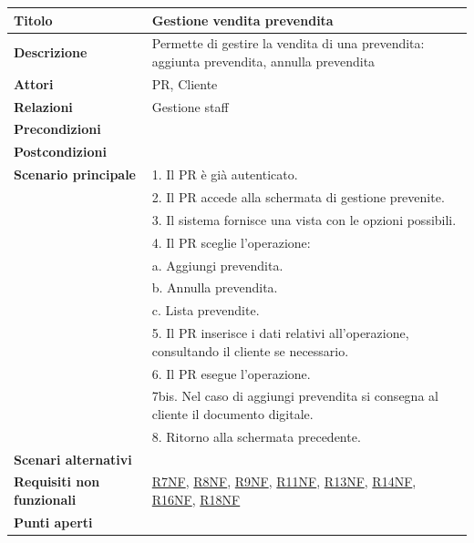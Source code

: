 \documentclass[a4paper]{article}
\begin{document}
\begin{center}
\begin{tabularx}{1\textwidth}{|l|X|}
    \hline
	\textbf{Titolo} & Gestione vendita prevendita \\
	\hline
	\textbf{Descrizione} & Permette di gestire la vendita di una prevendita: aggiunta prevendita, annulla prevendita \\
	\hline
	\textbf{Attori} & PR, Cliente \\
	\hline
	\textbf{Relazioni} & Gestione staff \\
	\hline
	\textbf{Precondizioni} &  \\
	\hline
	\textbf{Postcondizioni} &  \\
	\hline
	\textbf{Scenario principale} & 1. Il PR è già autenticato.\\
	                             & 2. Il PR accede alla schermata di gestione prevenite. \\
								 & 3. Il sistema fornisce una vista con le opzioni possibili. \\
								 & 4. Il PR sceglie l'operazione:\\
								 & \quad a. Aggiungi prevendita.\\
								 & \quad b. Annulla prevendita.\\
								 & \quad c. Lista prevendite.\\
								 & 5. Il PR inserisce i dati relativi all'operazione, consultando il cliente se necessario.\\
								 & 6. Il PR esegue l'operazione.\\
								 & 7bis. Nel caso di aggiungi prevendita si consegna al cliente il documento digitale.\\
								 & 8. Ritorno alla schermata precedente.\\
	\hline
	\textbf{Scenari alternativi} & \\
	\hline
	\textbf{Requisiti non funzionali} & \hyperlink{R7NF}{R7NF}, \hyperlink{R8NF}{R8NF}, \hyperlink{R9NF}{R9NF}, \hyperlink{R11NF}{R11NF}, \hyperlink{R13NF}{R13NF}, \hyperlink{R14NF}{R14NF}, \hyperlink{R16NF}{R16NF}, \hyperlink{R18NF}{R18NF}  \\
	\hline
	\textbf{Punti aperti} & \\
	\hline
\end{tabularx}
\end{center}

\end{document}

